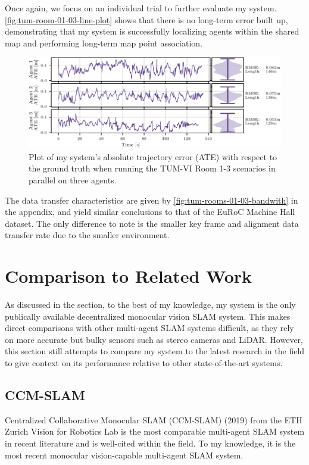 Once again, we focus on an individual trial to further evaluate my system. \autoref{fig:tum-room-01-03-line-plot} shows that there is no long-term error built up, demonstrating that my system is successfully localizing agents within the shared map and performing long-term map point association.

\begin{figure}[h]
    \centering
    \includegraphics[width=0.85\linewidth]{figures/apr11_tum_room_trajectory_a_line_plot.pdf}

    \caption{Plot of my system's absolute trajectory error (ATE) with respect to the ground truth when running the TUM-VI Room 1-3 scenarios in parallel on three agents.}
    \label{fig:tum-room-01-03-line-plot}
\end{figure}

The data transfer characteristics are given by \autoref{fig:tum-rooms-01-03-bandwith} in the appendix, and yield similar conclusions to that of the EuRoC Machine Hall dataset. The only difference to note is the smaller key frame and alignment data transfer rate due to the smaller environment.

\section{Comparison to Related Work}
\label{sec:comparison-to-related-work}

As discussed in the  section, to the best of my knowledge, my system is the only publically available decentralized monocular vision SLAM system. This makes direct comparisons with other multi-agent SLAM systems difficult, as they rely on more accurate but bulky sensors such as stereo cameras and LiDAR. However, this section still attempts to compare my system to the latest research in the field to give context on its performance relative to other state-of-the-art systems.

\subsection{CCM-SLAM}
\label{sec:ccm-slam}
Centralized Collaborative Monocular SLAM (CCM-SLAM) (2019) from the ETH Zurich Vision for Robotics Lab \autocite{schmuck2019ccm} is the most comparable multi-agent SLAM system in recent literature and is well-cited within the field. To my knowledge, it is the most recent monocular vision-capable multi-agent SLAM system.

